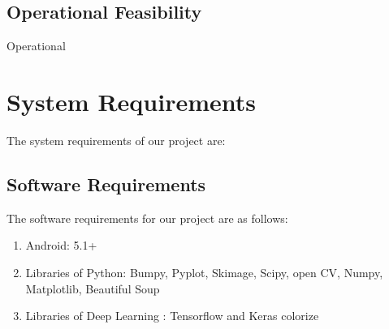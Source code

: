             
            \subsection{Operational Feasibility}
            Operational
            
            
        \section{System Requirements}
            The system requirements of our project are:

            \subsection{Software Requirements}
                The software requirements for our project are as follows:
        \begin{enumerate}[label=(\alph*)]
                  \setlength\itemsep{1.5pt}
          \item Android: 5.1+
          \item Libraries of Python: Bumpy, Pyplot, Skimage, Scipy, open CV, Numpy, Matplotlib, Beautiful Soup
          \item Libraries of Deep Learning : Tensorflow and Keras colorize
        \end{enumerate}
 
